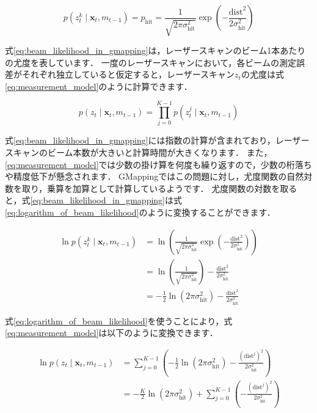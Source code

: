 \documentclass[{../../master}]{subfiles}
\begin{document}
\begin{equation}
  p(z_{t}^{k} \mid \bm{x}_{t}, m_{t-1}) = p_{\text{hit}} = \frac{1}{\sqrt{2\pi\sigma_{\text{hit}}^2}} \exp\left(-\frac{\text{dist}^2}{2\sigma_{\text{hit}}^2}\right)
  \label{eq:beam_likelihood_in_gmapping}
\end{equation}

式\ref{eq:beam_likelihood_in_gmapping}は，レーザースキャンのビーム1本あたりの尤度を表しています．
一度のレーザースキャンにおいて，各ビームの測定誤差がそれぞれ独立していると仮定すると，レーザースキャン$z_{t}$の尤度は式\ref{eq:measurement_model}のように計算できます．

\begin{equation}
  p(z_{t} \mid \bm{x}_{t}, m_{t-1}) = \prod_{j=0}^{K-1} p(z_{t}^{j} \mid \bm{x}_{t}, m_{t-1})
  \label{eq:measurement_model}
\end{equation}

式\ref{eq:beam_likelihood_in_gmapping}には指数の計算が含まれており，レーザースキャンのビーム本数が大きいと計算時間が大きくなります．
また，\ref{eq:measurement_model}では少数の掛け算を何度も繰り返すので，少数の桁落ちや精度低下が懸念されます．
GMappingではこの問題に対し，尤度関数の自然対数を取り，乗算を加算として計算しているようです．
尤度関数の対数を取ると，式\ref{eq:beam_likelihood_in_gmapping}は式\ref{eq:logarithm_of_beam_likelihood}のように変換することができます．

\begin{equation}
  \begin{split}
    \ln{p(z_{t}^{k} \mid \bm{x}_{t}, m_{t-1})} &= \ln{\left(\frac{1}{\sqrt{2\pi\sigma_{\text{hit}}^2}} \exp\left(-\frac{\text{dist}^2}{2\sigma_{\text{hit}}^2}\right)\right)} \\
    &= \ln{\left(\frac{1}{\sqrt{2\pi\sigma_{\text{hit}}^2}}\right)} - \frac{\text{dist}^2}{2\sigma_{\text{hit}}^2} \\
    &= -\frac{1}{2} \ln{(2\pi\sigma_{\text{hit}}^2)} - \frac{\text{dist}^2}{2\sigma_{\text{hit}}^2}
  \end{split}
  \label{eq:logarithm_of_beam_likelihood}
\end{equation}

式\ref{eq:logarithm_of_beam_likelihood}を使うことにより，式\ref{eq:measurement_model}は以下のように変換できます．

\begin{equation}
  \begin{split}
  \ln{p(z_{t} \mid \bm{x}_{t}, m_{t-1})} &= \sum_{j=0}^{K-1} \left(-\frac{1}{2} \ln{(2\pi\sigma_{\text{hit}}^2)} - \frac{(\text{dist}^{j})^2}{2\sigma_{\text{hit}}^2}\right) \\
    &= -\frac{K}{2} \ln{(2\pi\sigma_{\text{hit}}^2)} + \sum_{j=0}^{K-1} \left(-\frac{(\text{dist}^{j})^2}{2\sigma_{\text{hit}}^2}\right)
  \end{split}
  \label{eq:logarithm_measurement_model}
\end{equation}
\end{document}
